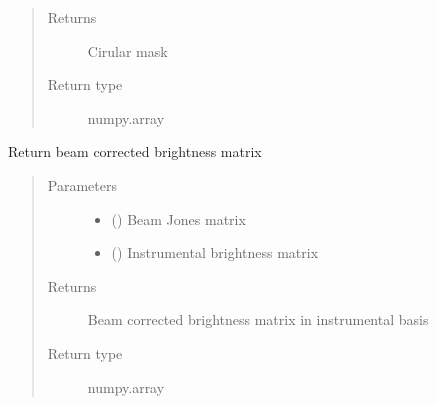\documentclass[letterpaper,10pt,english]{sphinxmanual}
\begin{document}
\begin{fulllineitems}
\begin{fulllineitems}
\begin{quote}
\begin{description}
\item[{Returns}] \leavevmode
\sphinxAtStartPar
Cirular mask

\item[{Return type}] \leavevmode
\sphinxAtStartPar
numpy.array

\end{description}\end{quote}

\end{fulllineitems}


\begin{fulllineitems}
\label{\detokenize{paircars:paircars.fullpol_selfcal_LTS.PolSelfcal.estimateSkyBrightnessMatrix}}
\sphinxAtStartPar
Return beam corrected brightness matrix
\begin{quote}\begin{description}
\item[{Parameters}] \leavevmode\begin{itemize}
\item {} 
\sphinxAtStartPar
{} () \textendash{} Beam Jones matrix

\item {} 
\sphinxAtStartPar
{} () \textendash{} Instrumental brightness matrix

\end{itemize}

\item[{Returns}] \leavevmode
\sphinxAtStartPar
Beam corrected brightness matrix in instrumental basis

\item[{Return type}] \leavevmode
\sphinxAtStartPar
numpy.array

\end{description}\end{quote}

\end{fulllineitems}



\end{fulllineitems}
\end{document}
